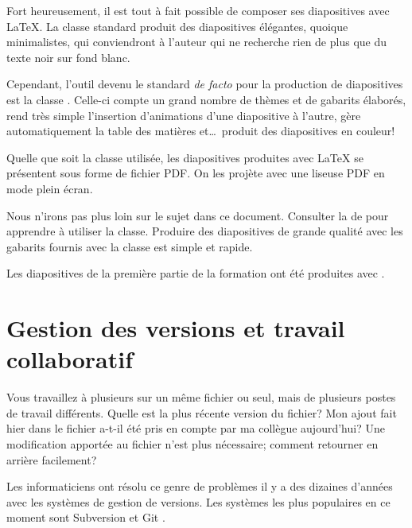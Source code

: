 Fort heureusement, il est tout à fait possible de composer ses
diapositives avec {\LaTeX}. La classe standard  produit
des diapositives élégantes, quoique minimalistes, qui conviendront à
l'auteur qui ne recherche rien de plus que du texte noir sur fond
blanc.

Cependant, l'outil devenu le standard \emph{de facto} pour la
production de diapositives est la classe 
\citep{beamer}. Celle-ci compte un grand nombre de thèmes et de
gabarits élaborés, rend très simple l'insertion d'animations d'une
diapositive à l'autre, gère automatiquement la table des matières
et\dots\ produit des diapositives en couleur!

Quelle que soit la classe utilisée, les diapositives produites avec
{\LaTeX} se présentent sous forme de fichier PDF. On les projète avec
une liseuse PDF en mode plein écran.

Nous n'irons pas plus loin sur le sujet dans ce document. Consulter
la %
de  pour apprendre à utiliser la classe. Produire des
diapositives de grande qualité avec les gabarits fournis avec la
classe est simple et rapide.

Les diapositives de la première partie de la formation
\citep{UL:latex:1} ont été produites avec .



\section{Gestion des versions et travail collaboratif}
\label{sec:trucs:cvs}

Vous travaillez à plusieurs sur un même fichier ou seul, mais de
plusieurs postes de travail différents. Quelle est la plus récente
version du fichier? Mon ajout fait hier dans le fichier a-t-il été
pris en compte par ma collègue aujourd'hui? Une modification apportée
au fichier n'est plus nécessaire; comment retourner en arrière
facilement?

Les informaticiens ont résolu ce genre de problèmes il y a des
dizaines d'années avec les systèmes de gestion de versions. Les
systèmes les plus populaires en ce moment sont Subversion
\citep{subversion} et Git \citep{git}.


